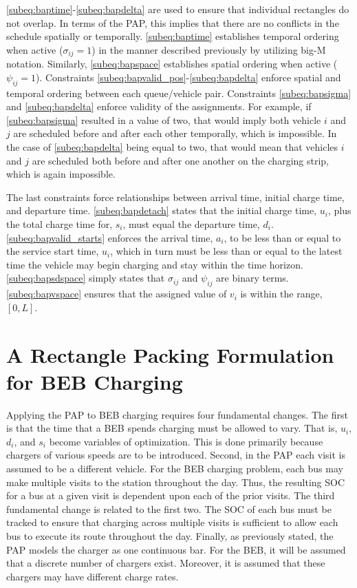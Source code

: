 \documentclass[utf8]{FrontiersinHarvard}
\begin{document}
\autoref{subeq:baptime}-\autoref{subeq:bapdelta} are used to ensure that individual rectangles do not overlap. In terms
of the PAP, this implies that there are no conflicts in the schedule spatially or temporally. \autoref{subeq:baptime}
establishes temporal ordering when active (\(\sigma_{ij}=1\)) in the manner described previously by utilizing big-M notation.
Similarly, \autoref{subeq:bapspace} establishes spatial ordering when active (\(\psi_{ij} =1\)). Constraints
\autoref{subeq:bapvalid_pos}-\autoref{subeq:bapdelta} enforce spatial and temporal ordering between each queue/vehicle
pair. Constraints \autoref{subeq:bapsigma} and \autoref{subeq:bapdelta} enforce validity of the assignments. For
example, if \autoref{subeq:bapsigma} resulted in a value of two, that would imply both vehicle \(i\) and \(j\) are scheduled
before and after each other temporally, which is impossible. In the case of \autoref{subeq:bapdelta} being equal to
two, that would mean that vehicles \(i\) and \(j\) are scheduled both before and after one another on the charging strip,
which is again impossible.

The last constraints force relationships between arrival time, initial charge time, and departure time.
\autoref{subeq:bapdetach} states that the initial charge time, \(u_i\), plus the total charge time for, \(s_i\), must equal
the departure time, \(d_i\). \autoref{subeq:bapvalid_starts} enforces the arrival time, \(a_i\), to be less than or equal to
the service start time, \(u_i\), which in turn must be less than or equal to the latest time the vehicle may begin
charging and stay within the time horizon. \autoref{subeq:bapsdspace} simply states that \(\sigma_{ij}\) and \(\psi_{ij}\) are
binary terms. \autoref{subeq:bapvspace} ensures that the assigned value of \(v_i\) is within the range, \([0,L]\).
\section{A Rectangle Packing Formulation for BEB Charging}
\label{sec:problemformulation}
Applying the PAP to BEB charging requires four fundamental changes. The first is that the time that a BEB spends
charging must be allowed to vary. That is, \(u_i\), \(d_i\), and \(s_i\) become variables of optimization. This is done
primarily because chargers of various speeds are to be introduced. Second, in the PAP each visit is assumed to be a
different vehicle. For the BEB charging problem, each bus may make multiple visits to the station throughout the day.
Thus, the resulting SOC for a bus at a given visit is dependent upon each of the prior visits. The third fundamental
change is related to the first two. The SOC of each bus must be tracked to ensure that charging across multiple visits
is sufficient to allow each bus to execute its route throughout the day. Finally, as previously stated, the PAP models
the charger as one continuous bar. For the BEB, it will be assumed that a discrete number of chargers exist. Moreover,
it is assumed that these chargers may have different charge rates.
\end{document}
